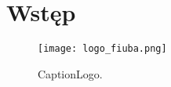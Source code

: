 \newpage %
\section[Wstęp]{Wstęp}
\lipsum[1] \cite{goossens93}
\begin{figure}[!h]
    \label{fig:anzelm}
    \centering \texttt{[image: logo\_fiuba.png]}
    \caption{CaptionLogo.}
\end{figure}
\lipsum[2-10]
